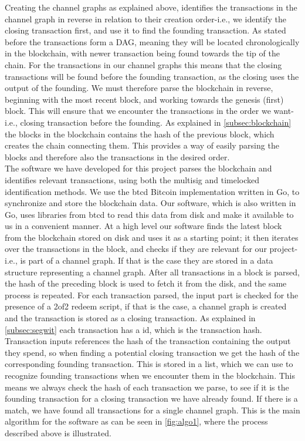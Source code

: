 Creating the channel graphs as explained above, identifies the transactions in the channel graph in reverse in relation to their creation order-i.e., we identify the closing transaction first, and use it to find the founding transaction. As stated before the transactions form a DAG, meaning they will be located chronologically in the blockchain, with newer transaction being found towards the tip of the chain. For the transactions in our channel graphs this means that the closing transactions will be found before the founding transaction, as the closing uses the output of the founding.
We must therefore parse the blockchain in reverse, beginning with the most recent block, and working towards the genesis (first) block.
This will ensure that we encounter the transactions in the order we want-i.e., closing transaction before the founding.
As explained in \cref{subsec:blockchain} the  blocks in the blockchain contains the hash of the previous block, which creates the chain connecting them. This provides a way of easily parsing the blocks and therefore also the transactions in the desired order. 
\\

The software we have developed for this project parses the blockchain and identifies relevant transactions, using both the multisig and timelocked identification methods.
We use the btcd \cite{btcd_roasbeef} Bitcoin implementation written in Go, to synchronize and store the blockchain data.
Our software, which is also written in Go, uses libraries from btcd to read this data from disk and make it available to us in a convenient manner.
At a high level our software finds the latest block from the blockchain stored on disk and uses it as a starting point;
it then iterates over the transactions in the block, and checks if they are relevant for our project-i.e., is part of a channel graph. If that is the case they are stored in a data structure representing a channel graph. After all transactions in a block is parsed, the hash of the preceding block is used to fetch it from the disk, and the same process is repeated.
For each transaction parsed, the input part is checked for the presence of a 2of2 redeem script, if that is the case, a channel graph is created and the transaction is stored as a closing transaction.
As explained in \cref{subsec:segwit} each transaction has a id, which is the transaction hash.
Transaction inputs references the hash of the transaction containing the output they spend, so when finding a potential closing transaction we get the hash of the corresponding founding transaction.
This is stored in a list, which we can use to recognize founding transactions when we encounter them in the blockchain.
This means we always check the hash of each transaction we parse, to see if it is the founding transaction for a closing transaction we have already found. If there is a match, we have found all transactions for a single channel graph. This is the main algorithm for the software as can be seen in \cref{fig:algo1}, where the process described above is illustrated.

